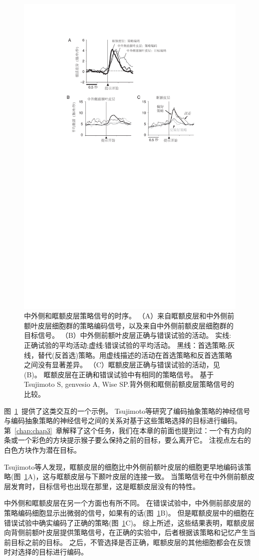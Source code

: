 \begin{figure}
	\centering
	\includegraphics[width=0.6\linewidth]{chap6/6_15}
	\caption{中外侧和眶额皮层策略信号的时序。
		（A）来自眶额皮层和中外侧前额叶皮层细胞群的策略编码信号，以及来自中外侧前额皮层细胞群的目标信号。
		（B）中外侧前额叶皮层正确与错误试验的活动。
		实线:正确试验的平均活动;虚线:错误试验的平均活动。
		黑线：首选策略;灰线，替代(反首选)策略。用虚线描述的活动在首选策略和反首选策略之间没有显著差异。
		（C）眶额皮层正确与错误试验的活动，见(B)。
		眶额皮层在正确和错误试验中有相同的策略信号。
		基于Tsujimoto S, genvesio A, Wise SP.背外侧和眶侧前额皮层策略信号的比较\cite{tsujimoto2011comparison}。}
	\label{fig:6_15}
\end{figure}


图~\ref{fig:6_15}~提供了这类交互的一个示例。
Tsujimoto等\cite{tsujimoto2011comparison}研究了编码抽象策略的神经信号与编码抽象策略的神经信号之间的关系对基于这些策略选择的目标进行编码。
第~\ref{chap:chap3}~章解释了这个任务，我们在本章的前面也提到过：一个有方向的条或一个彩色的方块提示猴子要么保持之前的目标，要么离开它。
注视点左右的白色方块作为潜在目标。


Tsujimoto等人发现，眶额皮层的细胞比中外侧前额叶皮层的细胞更早地编码该策略(图~\ref{fig:6_15}A)，这与眶额皮层与下颞叶皮层的连接一致。
当策略信号在中外侧前额皮层发育时，目标信号也出现在那里，这是眶额皮层没有的特性。


中外侧和眶额皮层在另一个方面也有所不同。
在错误试验中，中外侧前部皮层的策略编码细胞显示出微弱的信号，如果有的话(图~\ref{fig:6_15}B)。
但是眶额皮层中的细胞在错误试验中确实编码了正确的策略(图~\ref{fig:6_15}C)。
综上所述，这些结果表明，眶额皮层向背侧前额叶皮层提供策略信号，在正确的实验中，后者根据该策略和记忆产生当前目标之前的目标。
之后，不管选择是否正确，眶额皮层的其他细胞都会在反馈时对选择的目标进行编码。


